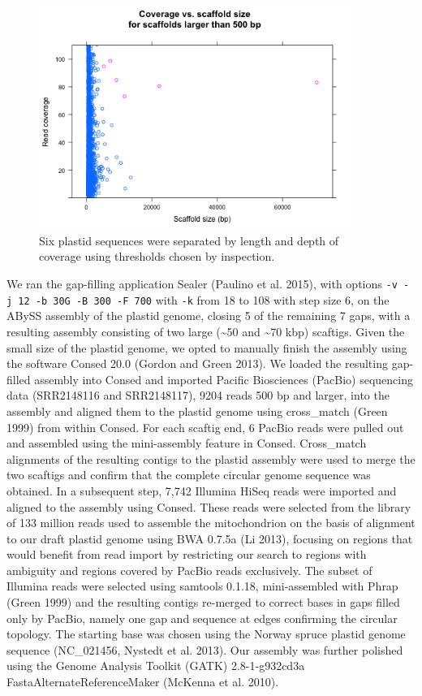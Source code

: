 \documentclass[
  12pt,
  oneside,
  openany]{book}
\begin{document}
\begin{figure}
\hypertarget{fig:whitespruce-classifycp}{%
\centering
\includegraphics[width=4in,height=\textheight]{whitespruce/plastid-classify.png}
\caption[Six plastid sequences were separated by length and depth of coverage using thresholds chosen by inspection.]{Six plastid sequences were separated by length and depth of coverage using thresholds chosen by inspection.}\label{fig:whitespruce-classifycp}
}
\end{figure}

We ran the gap-filling application Sealer (Paulino et al. 2015), with options \texttt{-v\ -j\ 12\ -b\ 30G\ -B\ 300\ -F\ 700} with \texttt{-k} from 18 to 108 with step size 6, on the ABySS assembly of the plastid genome, closing 5 of the remaining 7 gaps, with a resulting assembly consisting of two large (\textasciitilde50 and \textasciitilde70 kbp) scaftigs. Given the small size of the plastid genome, we opted to manually finish the assembly using the software Consed 20.0 (Gordon and Green 2013). We loaded the resulting gap-filled assembly into Consed and imported Pacific Biosciences (PacBio) sequencing data (SRR2148116 and SRR2148117), 9204 reads 500 bp and larger, into the assembly and aligned them to the plastid genome using cross\_match (Green 1999) from within Consed. For each scaftig end, 6 PacBio reads were pulled out and assembled using the mini-assembly feature in Consed. Cross\_match alignments of the resulting contigs to the plastid assembly were used to merge the two scaftigs and confirm that the complete circular genome sequence was obtained. In a subsequent step, 7,742 Illumina HiSeq reads were imported and aligned to the assembly using Consed. These reads were selected from the library of 133 million reads used to assemble the mitochondrion on the basis of alignment to our draft plastid genome using BWA 0.7.5a (Li 2013), focusing on regions that would benefit from read import by restricting our search to regions with ambiguity and regions covered by PacBio reads exclusively. The subset of Illumina reads were selected using samtools 0.1.18, mini-assembled with Phrap (Green 1999) and the resulting contigs re-merged to correct bases in gaps filled only by PacBio, namely one gap and sequence at edges confirming the circular topology. The starting base was chosen using the Norway spruce plastid genome sequence (NC\_021456, Nystedt et al. 2013). Our assembly was further polished using the Genome Analysis Toolkit (GATK) 2.8-1-g932cd3a FastaAlternateReferenceMaker (McKenna et al. 2010).
\end{document}
